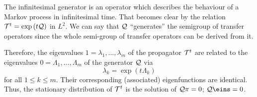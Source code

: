The infinitesimal generator is an operator which describes the behaviour of a Markov process in infinitesimal time. That becomes clear by the relation $\mathcal{T}^t = \exp{(t \mathcal{Q})}$ in $L^2$.  We can say that $\mathcal{Q}$ ``generates'' the semigroup of transfer operators since the whole semi-group of transfer operators can be derived from it.

Therefore, the eigenvalues $1 = \lambda_1,\dots,\lambda_m$ of the propagator $\mathcal{T}^t$ are related to the eigenvalues $0 = \Lambda_1,\dots,\Lambda_m$ of the generator $\mathcal{Q}$ via 
\begin{equation*}
\lambda_k = \exp(t\Lambda_k)
\end{equation*}
for all $1\leq k \leq m$. Their corresponding (associated) eigenfunctions are identical.
Thus, the stationary distribution of $\mathcal{T}^t$ is the solution of $\mathcal{Q}\pi = 0$;  $\Qcal\eins = 0$. 